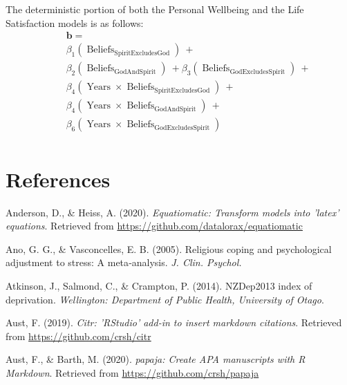 \documentclass[
  english,
  man,floatsintext]{apa6}
\begin{document}
The deterministic portion of both the Personal Wellbeing and the Life Satisfaction models is as follows:
\[
\begin{aligned}
& \quad  \boldsymbol{b} = \\
& \quad \beta_{1}(\operatorname{Beliefs}_{\operatorname{SpiritExcludesGod}})\ + \\
&\quad \beta_{2}(\operatorname{Beliefs}_{\operatorname{GodAndSpirit}})\ +  \beta_{3}(\operatorname{Beliefs}_{\operatorname{GodExcludesSpirit}})\ +\\
& \quad \beta_{4}(\operatorname{Years} \times \operatorname{Beliefs}_{\operatorname{SpiritExcludesGod}})\ + \\ 
& \quad \beta_{4}(\operatorname{Years} \times \operatorname{Beliefs}_{\operatorname{GodAndSpirit}})\ + \\
&\quad \beta_{6}(\operatorname{Years} \times \operatorname{Beliefs}_{\operatorname{GodExcludesSpirit}}) \\ 
\end{aligned}
\]
\newpage

\hypertarget{references}{%
\section{References}\label{references}}

\begingroup
\setlength{\parindent}{-0.5in}
\setlength{\leftskip}{0.5in}

\hypertarget{refs}{}
\leavevmode\hypertarget{ref-R-equatiomatic}{}%
Anderson, D., \& Heiss, A. (2020). \emph{Equatiomatic: Transform models into 'latex' equations}. Retrieved from \url{https://github.com/datalorax/equatiomatic}

\leavevmode\hypertarget{ref-Ano2005-hx}{}%
Ano, G. G., \& Vasconcelles, E. B. (2005). Religious coping and psychological adjustment to stress: A meta‐analysis. \emph{J. Clin. Psychol.}

\leavevmode\hypertarget{ref-Atkinson2014-ex}{}%
Atkinson, J., Salmond, C., \& Crampton, P. (2014). NZDep2013 index of deprivation. \emph{Wellington: Department of Public Health, University of Otago}.

\leavevmode\hypertarget{ref-R-citr}{}%
Aust, F. (2019). \emph{Citr: 'RStudio' add-in to insert markdown citations}. Retrieved from \url{https://github.com/crsh/citr}

\leavevmode\hypertarget{ref-R-papaja}{}%
Aust, F., \& Barth, M. (2020). \emph{papaja: Create APA manuscripts with R Markdown}. Retrieved from \url{https://github.com/crsh/papaja}
\end{document}
